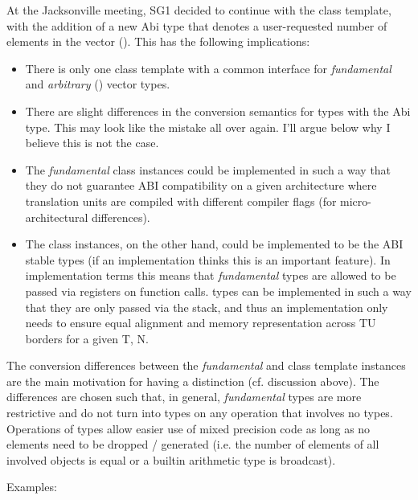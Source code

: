 At the Jacksonville meeting, SG1 decided to continue with the \simd[<T, Abi>] class template, with the addition of a new Abi type that denotes a user-requested number of elements in the vector (\fixedsizeN).
This has the following implications:
\begin{itemize}
  \item There is only one class template with a common interface for \textit{fundamental} and \textit{arbitrary} (\fixedsize) vector types.
  \item There are slight differences in the conversion semantics for \simd types with the \fixedsize Abi type.
    This may look like the  mistake all over again.
    I'll argue below why I believe this is not the case.
  \item The \textit{fundamental} class instances could be implemented in such a way that they do not guarantee ABI compatibility on a given architecture where translation units are compiled with different compiler flags (for micro-architectural differences).
  \item The \fixedsize class instances, on the other hand, could be implemented to be the ABI stable types (if an implementation thinks this is an important feature).
    In implementation terms this means that \textit{fundamental} types are allowed to be passed via registers on function calls.
    \fixedsize types can be implemented in such a way that they are only passed via the stack, and thus an implementation only needs to ensure equal alignment and memory representation across TU borders for a given \type T, \code N.
\end{itemize}

The conversion differences between the \textit{fundamental} and \fixedsize class template instances are the main motivation for having a distinction (cf. discussion above).
The differences are chosen such that, in general, \textit{fundamental} types are more restrictive and do not turn into \fixedsize types on any operation that involves no \fixedsize types.
Operations of \fixedsize types allow easier use of mixed precision code as long as no elements need to be dropped / generated (i.e. the number of elements of all involved \simd objects is equal or a builtin arithmetic type is broadcast).

Examples:

